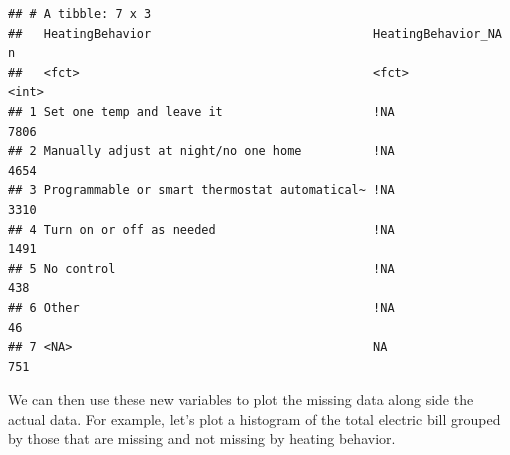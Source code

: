 \documentclass[
]{krantz}
\makeatletter
\newenvironment{Shaded}{\begin{snugshade}}{\end{snugshade}}
\newcommand{\AttributeTok}[1]{\textcolor[rgb]{0.27,0.27,0.27}{#1}}
\newcommand{\DecValTok}[1]{\textcolor[rgb]{0.06,0.06,0.06}{#1}}
\newcommand{\FunctionTok}[1]{\textcolor[rgb]{0.27,0.27,0.27}{\textbf{#1}}}
\newcommand{\NormalTok}[1]{#1}
\newcommand{\SpecialCharTok}[1]{\textcolor[rgb]{0.43,0.43,0.43}{\textbf{#1}}}
\newcommand{\StringTok}[1]{\textcolor[rgb]{0.5,0.5,0.5}{#1}}
\newenvironment{kframe}{%
\medskip{}
\setlength{\fboxsep}{.8em}
 \def\at@end@of@kframe{}%
 \ifinner\ifhmode%
  \def\at@end@of@kframe{\end{minipage}}%
  \begin{minipage}{\columnwidth}%
 \fi\fi%
 \def\FrameCommand##1{\hskip\@totalleftmargin \hskip-\fboxsep
 \colorbox{shadecolor}{##1}\hskip-\fboxsep
     \hskip-\linewidth \hskip-\@totalleftmargin \hskip\columnwidth}%
 \MakeFramed {\advance\hsize-\width
   \@totalleftmargin\z@ \linewidth\hsize
   \@setminipage}}%
 {\par\unskip\endMakeFramed%
 \at@end@of@kframe}
\renewenvironment{Shaded}{\begin{kframe}}{\end{kframe}}
\makeatother
\begin{document}
\begin{verbatim}
## # A tibble: 7 x 3
##   HeatingBehavior                               HeatingBehavior_NA     n
##   <fct>                                         <fct>              <int>
## 1 Set one temp and leave it                     !NA                 7806
## 2 Manually adjust at night/no one home          !NA                 4654
## 3 Programmable or smart thermostat automatical~ !NA                 3310
## 4 Turn on or off as needed                      !NA                 1491
## 5 No control                                    !NA                  438
## 6 Other                                         !NA                   46
## 7 <NA>                                          NA                   751
\end{verbatim}

We can then use these new variables to plot the missing data along side the actual data. For example, let's plot a histogram of the total electric bill grouped by those that are missing and not missing by heating behavior.

\begin{Shaded}
\end{Shaded}
\end{document}
